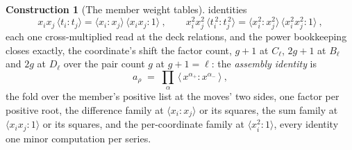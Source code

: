 \documentclass[11pt]{article}
\theoremstyle{definition}
\newtheorem{construction}{Construction}
\begin{document}
\begin{construction}[The member weight tables]
identities
\[
x_ix_j\,\langle t_i\!:\!t_j\rangle
=\langle x_i\!:\!x_j\rangle\,\langle x_ix_j\!:\!1\rangle\ ,
\qquad
x_i^2x_j^2\,\langle t_i^{\,2}\!:\!t_j^{\,2}\rangle
=\langle x_i^2\!:\!x_j^2\rangle\,\langle x_i^2x_j^2\!:\!1\rangle\ ,
\]
each one cross-multiplied read at the deck relations, and the
power bookkeeping closes exactly, the coordinate's shift the
factor count, $g+1$ at $C_\ell$, $2g+1$ at $B_\ell$ and $2g$ at
$D_\ell$ over
the pair count $g$ at $g+1=\ell$: the \emph{assembly identity} is
\[
a_\rho\;=\;\prod_{\alpha}\,
\big\langle\,x^{\alpha_+}\!:\!x^{\alpha_-}\,\big\rangle\ ,
\]
the fold over the member's positive list at the moves' two sides,
one factor per positive root, the difference family at
$\langle x_i\!:\!x_j\rangle$ or its squares, the sum family at
$\langle x_ix_j\!:\!1\rangle$ or its squares, and the
per-coordinate family at $\langle x_i^2\!:\!1\rangle$, every
identity one minor computation per series.
\end{construction}
\end{document}
